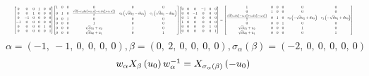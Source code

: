 \documentclass[11pt]{article}
\theoremstyle{definition}
\begin{document}
\[
\scaletoalign{\textwidth}{{\left[\begin{matrix}0 & 0 & 0 & 1 & 0 & 0\\0 & 0 & 1 & 0 & 0 & 0\\0 & -1 & 0 & 0 & 0 & 0\\-1 & 0 & 0 & 0 & 0 & 0\\0 & 0 & 0 & 0 & 1 & 0\\0 & 0 & 0 & 0 & 0 & 1\end{matrix}\right]} {\left[\begin{matrix}1 & 0 & 0 & 0 & 0 & 0\\0 & 1 & 0 & \frac{\sqrt{d} \left(- c_{0} d u_{3}^{2} + c_{0} u_{2}^{2} - c_{1} d u_{0}^{2} + c_{1} u_{1}^{2}\right)}{2} & c_{0} \left(\sqrt{d} u_{2} - d u_{3}\right) & c_{1} \left(\sqrt{d} u_{1} - d u_{0}\right)\\0 & 0 & 1 & 0 & 0 & 0\\0 & 0 & 0 & 1 & 0 & 0\\0 & 0 & 0 & \sqrt{d} u_{3} + u_{2} & 1 & 0\\0 & 0 & 0 & \sqrt{d} u_{0} + u_{1} & 0 & 1\end{matrix}\right]} {\left[\begin{matrix}0 & 0 & 0 & -1 & 0 & 0\\0 & 0 & -1 & 0 & 0 & 0\\0 & 1 & 0 & 0 & 0 & 0\\1 & 0 & 0 & 0 & 0 & 0\\0 & 0 & 0 & 0 & 1 & 0\\0 & 0 & 0 & 0 & 0 & 1\end{matrix}\right]} = {\left[\begin{matrix}1 & 0 & 0 & 0 & 0 & 0\\0 & 1 & 0 & 0 & 0 & 0\\\frac{\sqrt{d} \left(c_{0} d u_{3}^{2} - c_{0} u_{2}^{2} + c_{1} d u_{0}^{2} - c_{1} u_{1}^{2}\right)}{2} & 0 & 1 & 0 & c_{0} \left(- \sqrt{d} u_{2} + d u_{3}\right) & c_{1} \left(- \sqrt{d} u_{1} + d u_{0}\right)\\0 & 0 & 0 & 1 & 0 & 0\\\sqrt{d} u_{3} + u_{2} & 0 & 0 & 0 & 1 & 0\\\sqrt{d} u_{0} + u_{1} & 0 & 0 & 0 & 0 & 1\end{matrix}\right]}}
\]
\[
\alpha = \left( -1, \  -1, \  0, \  0, \  0, \  0\right), \beta = \left( 0, \  2, \  0, \  0, \  0, \  0\right), \sigma_{\alpha}(\beta) = \left( -2, \  0, \  0, \  0, \  0, \  0\right)
\]
\[
\scaletoalign{\textwidth}{w_{\alpha} X_{\beta}\left(u_{0}\right) w_{\alpha}^{-1} = X_{\sigma_{\alpha}\left(\beta\right)}\left(- u_{0}\right)}
\]
\end{document}

